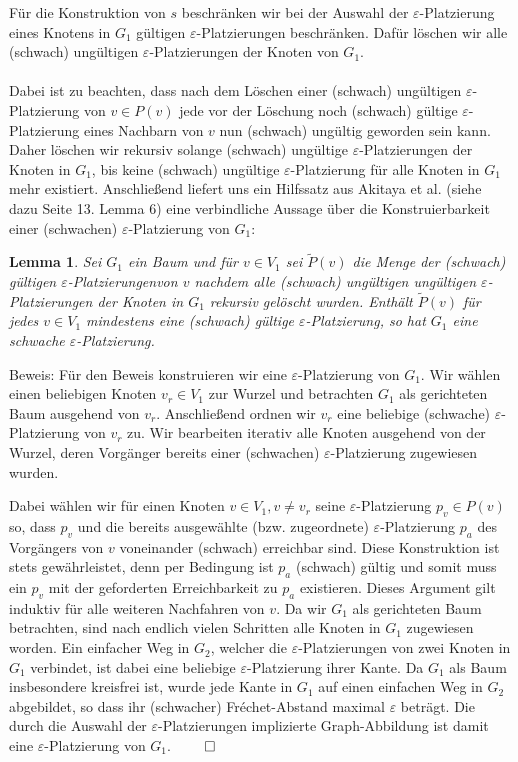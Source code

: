 \documentclass[a4paper, 12pt, twoside]{article}
\theoremstyle{Format1} %
\newtheorem{Lem}[Def]{Lemma}                %
\begin{document}
Für die Konstruktion von $s$ beschränken wir bei der Auswahl der $\varepsilon$-Platzierung eines Knotens in $G_1$ gültigen $\varepsilon$-Platzierungen beschränken.
Dafür löschen wir alle (schwach) ungültigen $\varepsilon$-Platzierungen der Knoten von $G_1$.
\\
\\
Dabei ist zu beachten, dass nach dem Löschen einer (schwach) ungültigen $\varepsilon$-Platzierung von $v \in P(v)$
jede vor der Löschung noch (schwach) gültige $\varepsilon$-Platzierung eines Nachbarn von $v$ nun (schwach) ungültig geworden sein kann.
Daher löschen wir rekursiv solange (schwach) ungültige $\varepsilon$-Platzierungen der Knoten in $G_1$, bis
keine (schwach) ungültige $\varepsilon$-Platzierung für alle Knoten in $G_1$ mehr existiert.
Anschließend liefert uns ein Hilfssatz aus Akitaya et al. (siehe dazu Seite 13. Lemma 6) eine verbindliche Aussage über die Konstruierbarkeit
einer (schwachen) $\varepsilon$-Platzierung von $G_1$:

\begin{Lem} \label {Lemma 1}
	Sei $G_1$ ein Baum und für $v \in V_1$ sei $\tilde{P}(v)$ die Menge der (schwach) gültigen $\varepsilon$-Platzierungenvon $v$ nachdem
	alle (schwach) ungültigen ungültigen $\varepsilon$-Platzierungen der Knoten in $G_1$ rekursiv gelöscht wurden. Enthält $\tilde{P}(v)$ für jedes
	$v \in V_1$ mindestens eine (schwach) gültige $\varepsilon$-Platzierung, so hat $G_1$ eine schwache $\varepsilon$-Platzierung.
\end{Lem}

Beweis:
Für den Beweis konstruieren wir eine $\varepsilon$-Platzierung von $G_1$.
Wir wählen einen beliebigen Knoten $v_r \in V_1$ zur Wurzel und betrachten $G_1$ als gerichteten Baum ausgehend von $v_r$.
Anschließend ordnen wir $v_r$ eine beliebige (schwache) $\varepsilon$-Platzierung von $v_r$ zu. Wir bearbeiten iterativ alle
Knoten ausgehend von der Wurzel, deren Vorgänger bereits einer (schwachen) $\varepsilon$-Platzierung zugewiesen wurden.

Dabei wählen wir für einen Knoten $v \in V_1, v \neq v_r$ seine $\varepsilon$-Platzierung $p_v \in P(v)$ so, dass $p_v$
und die bereits ausgewählte (bzw. zugeordnete) $\varepsilon$-Platzierung $p_a$ des Vorgängers von $v$ voneinander (schwach) erreichbar sind.
Diese Konstruktion ist stets gewährleistet, denn per Bedingung ist $p_a$ (schwach) gültig und somit muss ein $p_v$ mit der geforderten Erreichbarkeit zu $p_a$ existieren.
Dieses Argument gilt induktiv für alle weiteren Nachfahren von $v$. Da wir $G_1$ als gerichteten Baum betrachten, sind nach endlich vielen Schritten alle Knoten in $G_1$ zugewiesen worden.
Ein einfacher Weg in $G_2$, welcher die $\varepsilon$-Platzierungen von zwei Knoten in $G_1$ verbindet, ist dabei eine beliebige $\varepsilon$-Platzierung ihrer Kante.
Da $G_1$ als Baum insbesondere kreisfrei ist, wurde jede Kante in $G_1$ auf einen einfachen Weg in $G_2$ abgebildet, so dass ihr (schwacher) Fréchet-Abstand maximal $\varepsilon$ beträgt.
Die durch die Auswahl der $\varepsilon$-Platzierungen implizierte Graph-Abbildung ist damit eine $\varepsilon$-Platzierung von $G_1$. $\qed$
\\
\\
\end{document}
